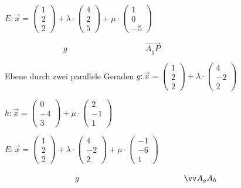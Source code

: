 \documentclass[paper=a6,landscape,ngerman,twoside=true,fontsize=12pt]{scrartcl}
\begin{document}
\begin{antwort}
	$E:\vec{x}=\left(\begin{array}{c} 1 \\ 2 \\ 2\end{array} \right)+\lambda \cdot \left(\begin{array}{c} 4 \\ 2 \\ 5\end{array} \right)+\mu \cdot \left(\begin{array}{c} 1 \\0 \\ -5\end{array} \right)$
	\bigskip
	
	$\hspace{3cm} g  \hspace{4cm} \vec{A_gP}$
	
\end{antwort}	
\begin{frage}
	\LARGE
	Ebene durch zwei parallele Geraden
	\large
	$g:\vec{x}=\left(\begin{array}{c} 1 \\ 2 \\ 2\end{array} \right)+\lambda \cdot \left(\begin{array}{c} 4 \\ -2 \\ 2\end{array} \right)$
	
	$h:\vec{x}=\left(\begin{array}{c} 0 \\ -4 \\ 3\end{array} \right)+\mu \cdot \left(\begin{array}{c} 2 \\ -1 \\ 1\end{array} \right)$
\end{frage}
\begin{antwort}
	
	$E:\vec{x}=\left(\begin{array}{c} 1 \\ 2 \\ 2\end{array} \right)+\lambda \cdot \left(\begin{array}{c} 4 \\ -2 \\ 2\end{array} \right)+\mu \cdot \left(\begin{array}{c} -1 \\-6 \\ 1\end{array} \right)$
	\bigskip
	
	$\hspace{3cm} g  \hspace{4.5cm} \vec{A_gA_h}$
	
\end{antwort}	
\end{document}
